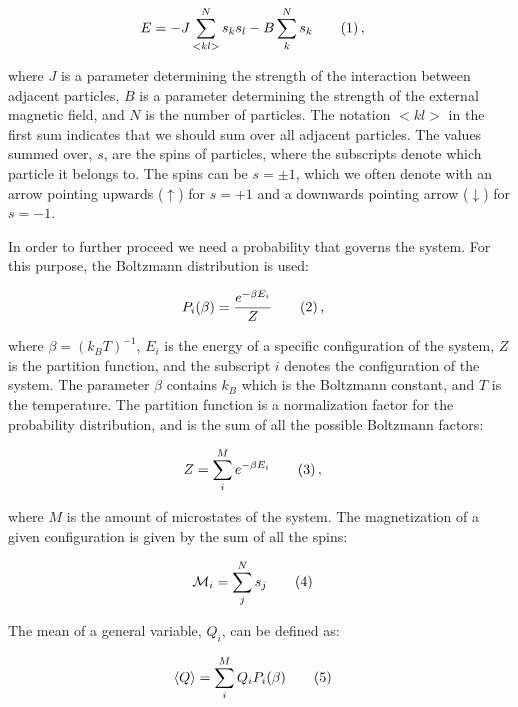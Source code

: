 \documentclass[reprint,english,notitlepage]{revtex4-1}  %
\newcommand\numberthis{\addtocounter{equation}{1}\tag{\theequation}}
\begin{document}
\begin{align*}
E &= -J \sum\limits_{<kl>}^N s_k s_l - B \sum\limits_k^N s_k \numberthis \label{eq:ising_general_total_energy} \, ,
\end{align*}

where $J$ is a parameter determining the strength of the interaction between adjacent particles, $B$ is a parameter determining the strength of the external magnetic field, and $N$ is the number of particles. The notation $<kl>$ in the first sum indicates that we should sum over all adjacent particles. The values summed over, $s$, are the spins of particles, where the subscripts denote which particle it belongs to. The spins can be $s = \pm 1$, which we often denote with an arrow pointing upwards ($\uparrow$) for $s = +1$ and a downwards pointing arrow ($\downarrow$) for $s = -1$.

In order to further proceed we need a probability that governs the system. For this purpose, the Boltzmann distribution is used:

\begin{align*}
P_i (\beta) &= \frac{e^{-\beta E_i}}{Z} \numberthis \label{eq:boltzmann_dist} \, ,
\end{align*}

where $\beta = (k_B T)^{-1}$, $E_i$ is the energy of a specific configuration of the system, $Z$ is the partition function, and the subscript $i$ denotes the configuration of the system. The parameter $\beta$ contains $k_B$ which is the Boltzmann constant, and $T$ is the temperature. The partition function is a normalization factor for the probability distribution, and is the sum of all the possible Boltzmann factors:

\begin{align*}
Z &= \sum\limits_i^M e^{-\beta E_i} \numberthis \label{eq:ising_partition_function} \, ,
\end{align*}  

where $M$ is the amount of microstates of the system. The magnetization of a given configuration is given by the sum of all the spins:

\begin{align*}
\mathcal{M}_i &= \sum\limits_j^N s_j \numberthis \label{eq:ising_magnetization}
\end{align*}

The mean of a general variable, $Q_i$, can be defined as:

\begin{align*}
\langle Q \rangle &= \sum\limits_i^M Q_i P_i(\beta) \numberthis \label{eq:mean}
\end{align*}
\end{document}
